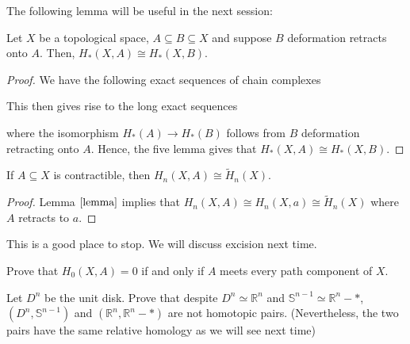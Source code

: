 \documentclass[12pt,reqno]{amsart}
\numberwithin{theorem}{section}
\theoremstyle{definition}
\theoremstyle{remark}
\numberwithin{equation}{section}
\renewcommand{\S}{\mathbb S}
\theoremstyle{definition}
\newcommand{\R}{\mathbb{R}}
\begin{document}
The following lemma will be useful in the next session:
\begin{lemma}\label{lemma}
    Let $X$ be a topological space, $A\subseteq  B \subseteq X$ and suppose $B$ deformation retracts onto $A$. Then, $H_*(X,A) \cong H_*(X,B)$.
\end{lemma}
\begin{proof}
We have the following exact sequences of chain complexes
    \begin{center}
    \end{center}
    This then gives rise to the long exact sequences
    \begin{center}
    \end{center}
    where the isomorphism $H_*(A)\rightarrow H_*(B)$ follows from $B$ deformation retracting onto $A$. Hence, the five lemma gives that $H_*(X,A) \cong H_*(X,B)$.
\end{proof}
\begin{corollary}\label{corollary116}
    If $A\subseteq X$ is contractible, then $H_n(X,A) \cong \tilde H_n(X)$.
\end{corollary}
\begin{proof}
    Lemma $\ref{lemma}$ implies that $H_n(X,A) \cong H_n(X,a) \cong \tilde H_n(X)$ where $A$ retracts to $a$. 
\end{proof}
This is a good place to stop. We will discuss excision next time.
\begin{exercise}
    Prove that $H_0(X,A) = 0$ if and only if $A$ meets every path component of $X$.
\end{exercise}
\begin{exercise}
    Let $D^n$ be the unit disk. Prove that despite $D^n\simeq \R^n$ and $\S^{n-1}\simeq \R^n-*$, $(D^n,\S^{n-1})$ and $(\R^n,\R^n-*) $ are not homotopic pairs. (Nevertheless, the two pairs have the same relative homology as we will see next time)
\end{exercise}
\end{document}
